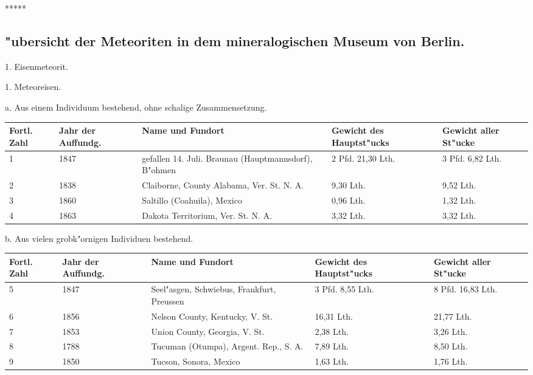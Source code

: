 \documentclass[a4paper, 11pt, oneside]{article}
\begin{document}
\centerline{*\hspace{15mm}*\hspace{15mm}*\hspace{15mm}*\hspace{15mm}*}
\clearpage
\subsection{"ubersicht der Meteoriten in dem mineralogischen Museum von Berlin.}
\begin{center}
1. Eisenmeteorit.
\end{center}
\begin{center}
1. Meteoreisen.
\end{center}
\begin{center}
a. Aus einem Individuum bestehend, ohne schalige Zusammensetzung.
\end{center}
\begin{center}
\begin{footnotesize}
\begin{tabular}{ |p{7mm}|p{9mm}|p{45mm}|p{23mm}|p{20mm}| }
    \hline
    Fortl. Zahl & Jahr der Auffundg. & Name und Fundort & Gewicht des Hauptst"ucks & Gewicht aller St"ucke\\
    \hline\hline
    1 & 1847 & gefallen 14. Juli. Braunau (Hauptmannsdorf), B"ohmen & 2 Pfd. 21,30 Lth. & 3 Pfd. 6,82 Lth.\\\hline
    2 & 1838 & Claiborne, County Alabama, Ver. St. N. A. & 9,30 Lth. & 9,52 Lth.\\\hline
    3 & 1860 & Saltillo (Coahuila), Mexico & 0,96 Lth. & 1,32 Lth.\\\hline
    4 & 1863 & Dakota Territorium, Ver. St. N. A. & 3,32 Lth. & 3,32 Lth.\\
    \hline
\end{tabular}
\end{footnotesize}
\end{center}
\begin{center}
b. Aus vielen grobk"ornigen Individuen bestehend.
\end{center}
\begin{center}
\begin{footnotesize}
\begin{tabular}{ |p{7mm}|p{9mm}|p{45mm}|p{20mm}|p{23mm}| }
    \hline
    Fortl. Zahl & Jahr der Auffundg. & Name und Fundort & Gewicht des Hauptst"ucks & Gewicht aller St"ucke\\
    \hline\hline
    5 & 1847 & Seel"asgen, Schwiebus, Frankfurt, Preussen & 3 Pfd. 8,55 Lth. & 8 Pfd. 16,83 Lth.\\\hline
    6 & 1856 & Nelson County, Kentucky, V. St. & 16,31 Lth. & 21,77 Lth.\\\hline
    7 & 1853 & Union County, Georgia, V. St. & 2,38 Lth. & 3,26 Lth.\\\hline
    8 & 1788 & Tucuman (Otumpa), Argent. Rep., S. A. & 7,89 Lth. & 8,50 Lth.\\\hline
    9 & 1850 & Tucson, Sonora, Mexico & 1,63 Lth. & 1,76 Lth.\\
    \hline
\end{tabular}
\end{footnotesize}
\end{center}
\end{document}
